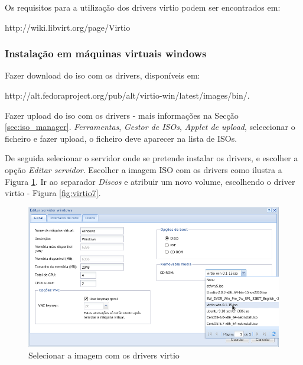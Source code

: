 Os requisitos para a utilização dos drivers virtio podem ser encontrados em: 

http://wiki.libvirt.org/page/Virtio

\subsubsection*{Instalação em máquinas virtuais windows}

Fazer download do iso com os drivers, disponíveis em:

http://alt.fedoraproject.org/pub/alt/virtio-win/latest/images/bin/.

Fazer upload do iso com os drivers - mais informações na Secção \ref{sec:iso_manager}. \textit{Ferramentas}, \textit{Gestor de ISOs}, \textit{Applet de upload}, seleccionar o ficheiro e fazer upload, o ficheiro deve aparecer na lista de ISOs.

De seguida selecionar o servidor onde se pretende instalar os drivers, e escolher a opção \textit{Editar servidor}. Escolher a imagem ISO com os drivers como ilustra a Figura \ref{fig:virtio4}. Ir ao separador \textit{Discos} e atribuir um novo volume, escolhendo o driver virtio - Figura \ref{fig:virtio7}.

\begin{figure}[H]
	\begin{center}
	\includegraphics[scale=0.5]{screenshots/virtio/virtio_4.png}
	\caption{Selecionar a imagem com os drivers virtio}
	\label{fig:virtio4}
	\end{center}
\end{figure}

